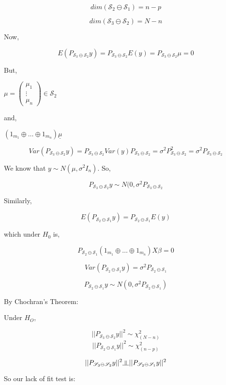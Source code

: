 \documentclass[11pt,fleqn]{book} %
\newcommand{\indep}{\rotatebox[origin=c]{90}{$\models$}}
\begin{document}
$$dim(\mathscr{S}_2 \ominus \mathscr{S}_1) = n-p$$

$$dim(\mathscr{S}_3 \ominus \mathscr{S}_2) = N-n$$

Now, 

$$E(P_{\mathscr{S}_3 \ominus \mathscr{S}_2}y) = P_{\mathscr{S}_3 \ominus \mathscr{S}_2}E(y) =P_{\mathscr{S}_3 \ominus \mathscr{S}_2} \mu  = 0 $$

But, 

$\mu = \begin{pmatrix}
	\mu_1\\
	\vdots\\
	\mu_n
\end{pmatrix} \in \mathscr{S}_2$

and, 

$(1_{m_1} \oplus \dots \oplus 1_{m_n})\underline{\mu}$

$$Var(P_{\mathscr{S}_3 \ominus \mathscr{S}_2}y) = P_{\mathscr{S}_3 \ominus \mathscr{S}_2}Var(y)P_{\mathscr{S}_3 \ominus \mathscr{S}_2} = \sigma^2 P^2_{\mathscr{S}_3 \ominus \mathscr{S}_2} = \sigma^2 P_{\mathscr{S}_3 \ominus \mathscr{S}_2} $$

We know that $y \sim N(\mu, \sigma^2 I_n)$. So, 

$$P_{\mathscr{S}_3 \ominus \mathscr{S}_2}y \sim N(0, \sigma^2 P_{\mathscr{S}_3 \ominus \mathscr{S}_2} $$

Similarly, 

$$ E(P_{\mathscr{S}_2 \ominus \mathscr{S}_1}y) = P_{\mathscr{S}_2 \ominus \mathscr{S}_1}E(y)$$

which under $H_0$ is, 

$$P_{\mathscr{S}_2 \ominus \mathscr{S}_1} (1_{m_1} \oplus \dots \oplus 1_{m_n})X\beta = 0 $$

$$Var(P_{\mathscr{S}_2 \ominus \mathscr{S}_1}y) = \sigma^2 P_{\mathscr{S}_2 \ominus \mathscr{S}_1} $$

$$P_{\mathscr{S}_2 \ominus \mathscr{S}_1} y \sim N(0, \sigma^2 P_{\mathscr{S}_2 \ominus \mathscr{S}_1})$$

By Chochran's Theorem: 

	Under $H_O$, 

	$$||P_{\mathscr{S}_3 \ominus \mathscr{S}_2} y||^2 \sim \chi^2_{(N-n)} $$
	$$||P_{\mathscr{S}_2 \ominus \mathscr{S}_1} y||^2 \sim \chi^2_{(n-p)} $$

	$$||P_{\mathscr{S}_3 \ominus \mathscr{S}_2} y||^2 \indep  ||P_{\mathscr{S}_2 \ominus \mathscr{S}_1} y||^2$$

So our lack of fit test is: 
\end{document}
